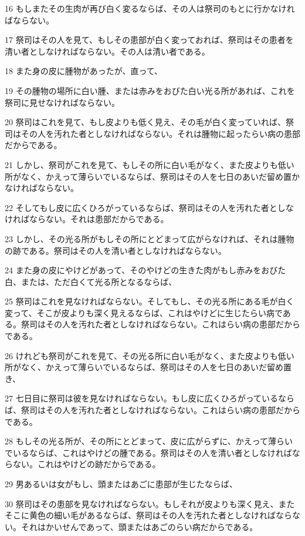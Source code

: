 \par 16 もしまたその生肉が再び白く変るならば、その人は祭司のもとに行かなければならない。
\par 17 祭司はその人を見て、もしその患部が白く変っておれば、祭司はその患者を清い者としなければならない。その人は清い者である。
\par 18 また身の皮に腫物があったが、直って、
\par 19 その腫物の場所に白い腫、または赤みをおびた白い光る所があれば、これを祭司に見せなければならない。
\par 20 祭司はこれを見て、もし皮よりも低く見え、その毛が白く変っていれば、祭司はその人を汚れた者としなければならない。それは腫物に起ったらい病の患部だからである。
\par 21 しかし、祭司がこれを見て、もしその所に白い毛がなく、また皮よりも低い所がなく、かえって薄らいでいるならば、祭司はその人を七日のあいだ留め置かなければならない。
\par 22 そしてもし皮に広くひろがっているならば、祭司はその人を汚れた者としなければならない。それは患部だからである。
\par 23 しかし、その光る所がもしその所にとどまって広がらなければ、それは腫物の跡である。祭司はその人を清い者としなければならない。
\par 24 また身の皮にやけどがあって、そのやけどの生きた肉がもし赤みをおびた白、または、ただ白くて光る所となるならば、
\par 25 祭司はこれを見なければならない。そしてもし、その光る所にある毛が白く変って、そこが皮よりも深く見えるならば、これはやけどに生じたらい病である。祭司はその人を汚れた者としなければならない。これはらい病の患部だからである。
\par 26 けれども祭司がこれを見て、その光る所に白い毛がなく、また皮よりも低い所がなく、かえって薄らいでいるならば、祭司はその人を七日のあいだ留め置き、
\par 27 七日目に祭司は彼を見なければならない。もし皮に広くひろがっているならば、祭司はその人を汚れた者としなければならない。これはらい病の患部だからである。
\par 28 もしその光る所が、その所にとどまって、皮に広がらずに、かえって薄らいでいるならば、これはやけどの腫である。祭司はその人を清い者としなければならない。これはやけどの跡だからである。
\par 29 男あるいは女がもし、頭またはあごに患部が生じたならば、
\par 30 祭司はその患部を見なければならない。もしそれが皮よりも深く見え、またそこに黄色の細い毛があるならば、祭司はその人を汚れた者としなければならない。それはかいせんであって、頭またはあごのらい病だからである。

